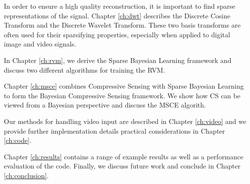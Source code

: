 In order to ensure a high quality reconstruction, it is important to find sparse representations of the signal.
Chapter \ref{ch:dwt} describes the Discrete Cosine Transform and the Discrete Wavelet Transform.
These two basis transforms are often used for their sparsifying properties, especially when applied to digital image and video signals.

In Chapter \ref{ch:rvm}, we derive the Sparse Bayesian Learning framework and discuss two different algorithms for training the RVM.

Chapter \ref{ch:msce} combines Compressive Sensing with Sparse Bayesian Learning to form the Bayesian Compressive Sensing framework.
We show how CS can be viewed from a Bayesian perspective and discuss the MSCE algorith.

Our methods for handling video input are described in Chapter \ref{ch:video} and we provide further implementation details practical considerations in Chapter \ref{ch:code}.

Chapter \ref{ch:results} contains a range of example results as well as a performance evaluation of the code.
Finally, we discuss future work and conclude in Chapter \ref{ch:conclusion}.

